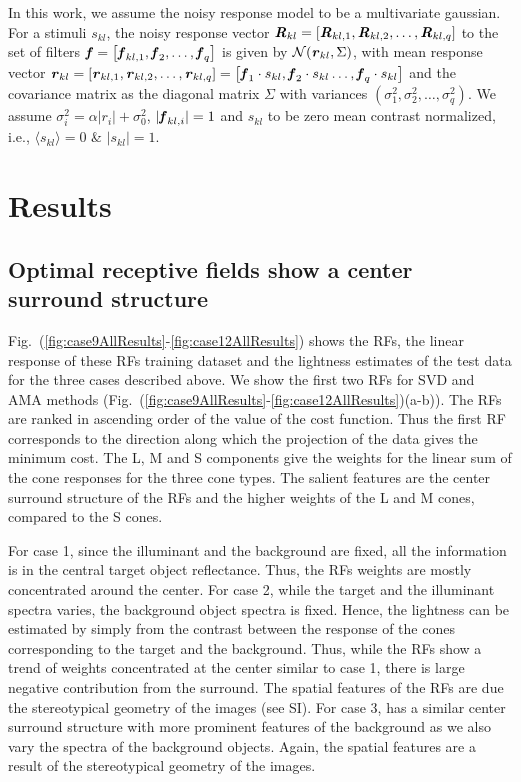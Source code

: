 \documentclass{jov}
\begin{document}
In this work, we assume the noisy response model to be a multivariate gaussian. For a stimuli $s_{kl}$, the noisy response vector ${\textbf{\textit R}}_{kl} = \left[{\textbf{\textit R}}_{kl,1},{\textbf{\textit R}}_{kl,2},\dots,{\textbf{\textit R}}_{kl,q}\right]$ to the set of filters ${\textbf{\textit f}} = \left[{\textbf{\textit f}}_{kl,1},{\textbf{\textit f}}_{2},\dots,{\textbf{\textit f}}_{q}\right]$ is given by $\mathcal{N}({\textbf{\textit r}}_{kl}, \Sigma)$, with mean response vector ${\textbf{\textit r}}_{kl} = \left[{\textbf{\textit r}}_{kl,1},{\textbf{\textit r}}_{kl,2},\dots,{\textbf{\textit r}}_{kl,q}\right] = \left[{\textbf{\textit f}}_{1}\cdot s_{kl},{\textbf{\textit f}}_{2}\cdot s_{kl}\dots,{\textbf{\textit f}}_{q}\cdot s_{kl}\right]$ and the covariance matrix as the diagonal matrix $\Sigma$ with variances $\left(\sigma_1^2, \sigma_2^2,\dots, \sigma_q^2 \right)$. We assume $\sigma_i^2 = \alpha |r_i| + \sigma_0^2$, $|{\textbf{\textit f}}_{kl,i}|=1$ and $s_{kl}$ to be zero mean contrast normalized, i.e., $\langle{s_{kl}}\rangle = 0$ \& ${|s_{kl}|=1}$.

\section{Results} \label{Results}
\subsection{Optimal receptive fields show a center surround structure}
Fig.~(\ref{fig:case9AllResults}-\ref{fig:case12AllResults}) shows the RFs, the linear response of these RFs training dataset and the lightness estimates of the test data for the three cases described above. We show the first two RFs for SVD and AMA methods (Fig.~(\ref{fig:case9AllResults}-\ref{fig:case12AllResults})(a-b)). The RFs are ranked in ascending order of the value of the cost function. Thus the first RF corresponds to the direction along which the projection of the data gives the minimum cost. The L, M and S components give the weights for the linear sum of the cone responses for the three cone types. The salient features are the center surround structure of the RFs and the higher weights of the L and M cones, compared to the S cones. 

For case 1, since the illuminant and the background are fixed, all the information is in the central target object reflectance. Thus, the RFs weights are mostly concentrated around the center. For case 2, while the target and the illuminant spectra varies, the background object spectra is fixed. Hence, the lightness can be estimated by simply from the contrast between the response of the cones corresponding to the target and the background. Thus, while the RFs show a trend of weights concentrated at the center similar to case 1, there is large negative contribution from the surround. The spatial features of the RFs are due the stereotypical geometry of the images (see SI). For case 3, has a similar center surround structure with more prominent features of the background as we also vary the spectra of the background objects. Again, the spatial features are a result of the stereotypical geometry of the images.
\end{document}
